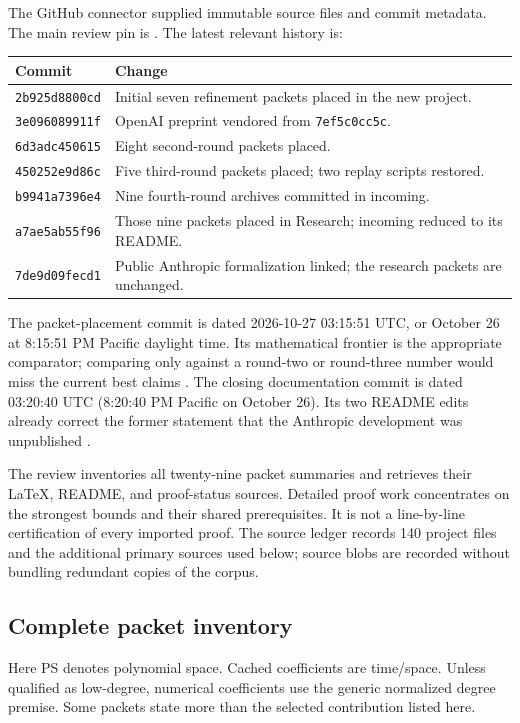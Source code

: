 The GitHub connector supplied immutable source files and commit metadata.
The main review pin is \pin. The latest relevant history is:
\begin{center}\small
\begin{tabular}{p{3.0cm}p{10.7cm}}
\toprule Commit & Change\\\midrule
\texttt{2b925d8800cd} & Initial seven refinement packets placed in the new project.\\
\texttt{3e096089911f} & OpenAI preprint vendored from \texttt{7ef5c0cc5c}.\\
\texttt{6d3adc450615} & Eight second-round packets placed.\\
\texttt{450252e9d86c} & Five third-round packets placed; two replay scripts restored.\\
\texttt{b9941a7396e4} & Nine fourth-round archives committed in incoming.\\
\texttt{a7ae5ab55f96} & Those nine packets placed in Research; incoming reduced to its README.\\
\texttt{7de9d09fecd1} & Public Anthropic formalization linked; the research packets are unchanged.\\
\bottomrule
\end{tabular}\end{center}
The packet-placement commit is dated 2026-10-27 03:15:51 UTC, or October 26 at
8:15:51 PM Pacific daylight time. Its mathematical frontier is the
appropriate comparator; comparing only against a round-two or round-three
number would miss the current best claims \cite{index,placement}.
The closing documentation commit is dated 03:20:40 UTC (8:20:40 PM Pacific
on October 26). Its two README edits already correct the former statement
that the Anthropic development was unpublished \cite{closing}.

The review inventories all twenty-nine packet summaries and retrieves their
LaTeX, README, and proof-status sources. Detailed proof work concentrates on
the strongest bounds and their shared prerequisites. It is not a line-by-line
certification of every imported proof. The source ledger records 140 project
files and the additional primary sources used below; source blobs are
recorded without bundling redundant copies of the corpus.

\subsection{Complete packet inventory}

Here PS denotes polynomial space. Cached coefficients are time/space.
Unless qualified as low-degree, numerical coefficients use the generic
normalized degree premise. Some packets state more than the selected
contribution listed here.

